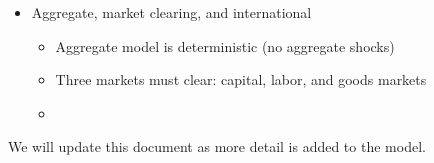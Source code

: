 \begin{itemize}
\begin{itemize}
  \end{itemize}
  \item Aggregate, market clearing, and international
  \begin{itemize}
    \item Aggregate model is deterministic (no aggregate shocks)
    \item Three markets must clear: capital, labor, and goods markets
    \item
  \end{itemize}
\end{itemize}


We will update this document as more detail is added to the model.

